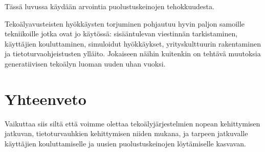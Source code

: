 Tässä luvussa käydään arvointia puolustuskeinojen tehokkuudesta.

Tekoälyavusteisten hyökkäysten torjuminen pohjautuu hyvin paljon samoille tekniikoille jotka ovat jo käytössä: sisääntulevan viestinnän tarkistaminen, käyttäjien kouluttaminen, simuloidut hyökkäykset, yrityskulttuurin rakentaminen ja tietoturvaohjeistusten ylläito. Jokaiseen näihin kuitenkin on tehtävä muutoksia generatiivisen tekoälyn luoman uuden uhan vuoksi.


\section*{Yhteenveto}

Vaikuttaa siis siltä että voimme olettaa tekoälyjärjestelmien nopean kehittymisen jatkuvan, tietoturvauhkien kehittymisen niiden mukana, ja tarpeen jatkuvalle käyttäjien kouluttamiselle ja uusien puolustuskeinojen löytämiselle kasvavan.